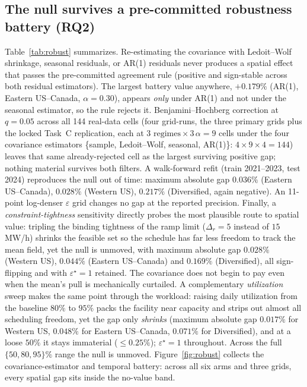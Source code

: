 \documentclass[12pt]{article}
\begin{document}
\subsection{The null survives a pre-committed robustness battery
(RQ2)}\label{sec:res-robust}
Table~\ref{tab:robust} summarizes. Re-estimating the covariance with Ledoit--Wolf
shrinkage, seasonal residuals, or AR(1) residuals never produces a spatial effect
that passes the pre-committed agreement rule (positive and sign-stable across
both residual estimators). The largest battery value anywhere, $+0.179\%$ (AR(1),
Eastern US--Canada, $\alpha=0.30$), appears \emph{only} under AR(1) and not under the
seasonal estimator, so the rule rejects it. Benjamini--Hochberg correction at
$q=0.05$ across all 144 real-data cells (four grid-runs, the three primary grids
plus the locked Task~C replication, each at $3\text{ regimes}\times3\,\alpha=9$ cells
under the four covariance estimators \{sample, Ledoit--Wolf, seasonal, AR(1)\}:
$4\times9\times4=144$) leaves that same already-rejected cell as the largest
surviving positive gap; nothing material survives both filters.
A walk-forward refit (train 2021--2023, test 2024) reproduces the null out of
time: maximum absolute gap $0.036\%$ (Eastern US--Canada), $0.028\%$
(Western US), $0.217\%$ (Diversified, again negative). An
11-point log-denser $\varepsilon$ grid changes no gap at the reported precision.
Finally, a \emph{constraint-tightness} sensitivity directly probes the most
plausible route to spatial value: tripling the binding tightness of the ramp limit
($\Delta_r=5$ instead of $15$ MW/h) shrinks the feasible set so the schedule has far
less freedom to track the mean field, yet the null is unmoved, with maximum
absolute gap $0.028\%$ (Western US), $0.044\%$ (Eastern US--Canada) and $0.169\%$
(Diversified), all sign-flipping and with $\varepsilon^\star=1$ retained.
The covariance does not begin to pay even when the mean's pull is mechanically
curtailed. A complementary \emph{utilization} sweep makes the same point through the
workload: raising daily utilization from the baseline $80\%$ to $95\%$ packs the
facility near capacity and strips out almost all scheduling freedom, yet the gap
only \emph{shrinks} (maximum absolute gap $0.017\%$ for Western US, $0.048\%$ for
Eastern US--Canada, $0.071\%$ for Diversified), and at a loose $50\%$ it stays
immaterial ($\le0.25\%$); $\varepsilon^\star=1$ throughout. Across the full
$\{50,80,95\}\%$ range the null is unmoved. Figure~\ref{fig:robust} collects the
covariance-estimator and temporal battery: across all six arms and three grids,
every spatial gap sits inside the no-value band.
\end{document}
